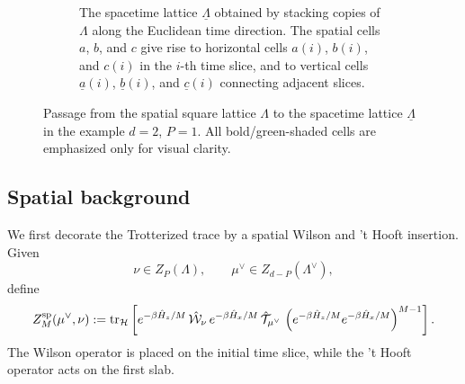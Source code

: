 \begin{figure}[h]
\begin{subfigure}[t]{0.48\textwidth}
		\caption{The spacetime lattice \(\underline{\Lambda}\) obtained by stacking copies of \(\Lambda\) along the Euclidean time direction. The spatial cells \(a\), \(b\), and \(c\) give rise to horizontal cells \(a(i)\), \(b(i)\), and \(c(i)\) in the \(i\)-th time slice, and to vertical cells \(\underline a(i)\), \(\underline b(i)\), and \(\underline c(i)\) connecting adjacent slices.}
		\label{fig:spacetimeL}
	\end{subfigure}
	
	\caption{Passage from the spatial square lattice \(\Lambda\) to the spacetime lattice \(\underline{\Lambda}\) in the example \(d=2\), \(P=1\). All bold/green-shaded cells are emphasized only for visual clarity.}
	\label{fig:space2spacetime}
\end{figure}



\subsection{Spatial background}
\label{sec:trotter-with-insertions}

We first decorate the Trotterized trace by a spatial Wilson and 't Hooft insertion. Given
\begin{equation}
\nu\in Z_P(\Lambda),
\qquad
\mu^\vee\in Z_{d-P}(\Lambda^\vee),
\end{equation}
define
\begin{equation}
	Z_M^{\mathrm{sp}}(\mu^\vee,\nu)
	:=
	\mathrm{tr}_{\mathcal H}
	\left[
	e^{-\beta\hat H_z/M}\,
	\hat{\mathcal W}_\nu\,
	e^{-\beta\hat H_x/M}\,
	\hat{\mathcal T}_{\mu^\vee}\,
	\left(e^{-\beta\hat H_z/M}e^{-\beta\hat H_x/M}\right)^{M-1}
	\right].
	\label{eq:WTtrotter}
\end{equation}
The Wilson operator is placed on the initial time slice, while the 't Hooft operator acts
on the first slab.

